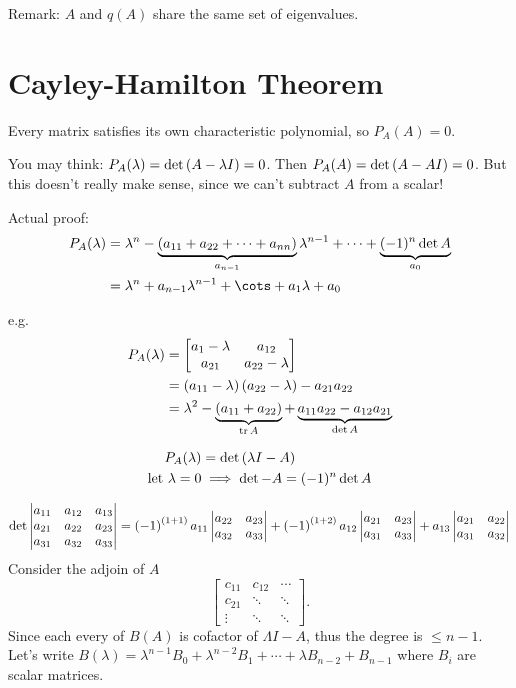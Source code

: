\documentclass{article}
\DeclareMathOperator{\trace}{tr}
\newcommand{\m}[1]{\begin{bmatrix} #1 \end{bmatrix}}
\newcommand{\vm}[1]{\begin{vmatrix} #1 \end{vmatrix}}
\begin{document}
Remark: \(A\) and \(q(A)\) share the same set of eigenvalues.

\section{Cayley-Hamilton Theorem}
Every matrix satisfies its own characteristic polynomial, so \(P_A(A) = 0\).

You may think: \(P_A(\lambda) = \det\del{A -  \lambda I} = 0\). Then \(P_A(A) = \det\del{A - AI} = 0\).
But this doesn't really make sense, since we can't subtract \(A\) from a scalar!

Actual proof:
\begin{align*}
  P_A(\lambda) &= \lambda^n - \underbrace{(a_{11} + a_{22} + \cdots +a_{nn})}_{a_{n-1}} \lambda^{n-1} + \cdots + \underbrace{(-1)^n\det A}_{a_0}\\
  &= \lambda^n +a_{n-1}\lambda^{n-1} + \cots + a_1 \lambda + a_0
\end{align*}

e.g.
\begin{align*}
  P_A(\lambda) &= \m{a_{1} - \lambda & a_{12}\\ a_{21} & a_{22} - \lambda} \\
              &= \del{a_{11} - \lambda}\del{a_{22} - \lambda} - a_{21}a_{22}\\
                &= \lambda^2 - \underbrace{\del{a_{11} + a_{22}}}_{\trace A} + \underbrace{a_{11} a_{22} - a_{12}a_{21} }_{\det A}
\end{align*}

\begin{align*}
  P_A(\lambda) &= \det\del{\lambda I - A}\\
  \text{let \(\lambda = 0\)} & \implies \det{-A} = (-1)^n \det A
\end{align*}

\[\det \vm{a_{11} & a_{12} & a_{13}\\ a_{21}  & a_{22} & a_{23}\\ a_{31} & a_{32} & a_{33}} = \del{-1}^{\del{1 + 1}} a_{11} \vm{a_{22} & a_{23}\\ a_{32} & a_{33}} + \del{-1}^{\del{1+2}}a_{12}\vm{a_{21} & a_{23}\\ a_{31} & a_{33}} + a_{13}\vm{a_{21} & a_{22}\\ a_{31} & a_{32}}\]
Consider the adjoin of \(A\)
\[\m{c_{11} & c_{12} & \cdots\\c_{21} & \ddots & \ddots\\  \vdots & \ddots & \ddots}.\]
Since each every of \(B(A)\) is cofactor of \(\Lambda I - A\), thus the degree is \(\leq n-1\).
Let's write \(B(\lambda) = \lambda^{n-1}B_0 + \lambda^{n-2}B_1 + \cdots + \lambda B_{n-2} + B_{n-1}\) where \(B_i\) are scalar matrices.
\end{document}
